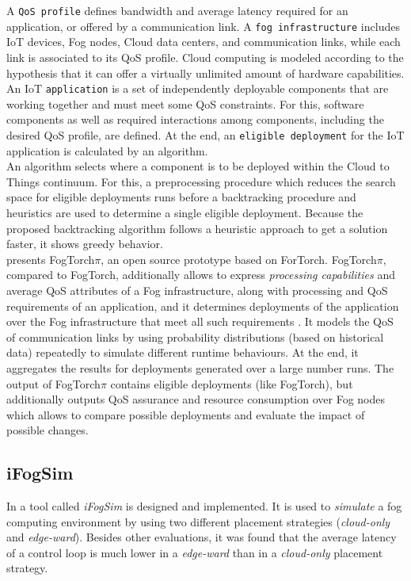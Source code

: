 A \texttt{QoS profile} defines bandwidth and average latency required for an application, or offered by a communication link. A \texttt{fog infrastructure} includes IoT devices, Fog nodes, Cloud data centers, and communication links, while each link is associated to its QoS profile. Cloud computing is modeled according to the hypothesis that it can offer a virtually unlimited amount of hardware capabilities. An IoT \texttt{application} is a set of independently deployable components that are working together and must meet some QoS constraints. For this, software components as well as required interactions among components, including the desired QoS profile, are defined. At the end, an \texttt{eligible deployment} for the IoT application is calculated by an algorithm.\\

An algorithm selects where a component is to be deployed within the Cloud to Things continuum. For this, a preprocessing procedure which reduces the search space for eligible deployments runs before a backtracking procedure and heuristics are used to determine a single eligible deployment. Because the proposed backtracking algorithm follows a heuristic approach to get a solution faster, it shows greedy behavior.\\

\cite{fogtorchpi} presents FogTorch$\pi$, an open source prototype based on ForTorch\cite{fogtorch}. FogTorch$\pi$, compared to FogTorch, additionally allows to express \textit{processing capabilities} and average QoS attributes of a Fog infrastructure, along with processing and QoS requirements of an application, and it determines deployments of the application over the Fog infrastructure that meet all such requirements \cite{fogtorchpi}. It models the QoS of communication links by using probability distributions (based on historical data) repeatedly to simulate different runtime behaviours. At the end, it aggregates the results for deployments generated over a large number runs. The output of FogTorch$\pi$ contains eligible deployments (like FogTorch), but additionally outputs QoS assurance and resource consumption over Fog nodes which allows to compare possible deployments and evaluate the impact of possible changes.

\subsection{iFogSim}

In \cite{ifogsim} a tool called \textit{iFogSim} is designed and implemented. It is used to \textit{simulate} a fog computing environment by using two different placement strategies (\textit{cloud-only} and \textit{edge-ward}). Besides other evaluations, it was found that the average latency of a control loop is much lower in a \textit{edge-ward} than in a \textit{cloud-only}  placement strategy.\\

